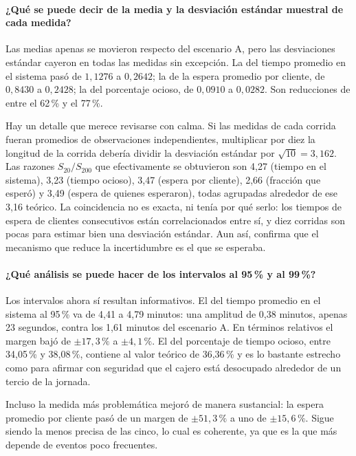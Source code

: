 \documentclass[11pt,letterpaper]{article}
\begin{document}


\paragraph{¿Qué se puede decir de la media y la desviación estándar muestral de cada medida?}

Las medias apenas se movieron respecto del escenario A, pero las desviaciones estándar cayeron en todas las medidas sin excepción. La del tiempo promedio en el sistema pasó de $1{,}1276$ a $0{,}2642$; la de la espera promedio por cliente, de $0{,}8430$ a $0{,}2428$; la del porcentaje ocioso, de $0{,}0910$ a $0{,}0282$. Son reducciones de entre el 62\,\% y el 77\,\%.

Hay un detalle que merece revisarse con calma. Si las medidas de cada corrida fueran promedios de observaciones independientes, multiplicar por diez la longitud de la corrida debería dividir la desviación estándar por $\sqrt{10} = 3{,}162$. Las razones $S_{20}/S_{200}$ que efectivamente se obtuvieron son 4,27 (tiempo en el sistema), 3,23 (tiempo ocioso), 3,47 (espera por cliente), 2,66 (fracción que esperó) y 3,49 (espera de quienes esperaron), todas agrupadas alrededor de ese 3,16 teórico. La coincidencia no es exacta, ni tenía por qué serlo: los tiempos de espera de clientes consecutivos están correlacionados entre sí, y diez corridas son pocas para estimar bien una desviación estándar. Aun así, confirma que el mecanismo que reduce la incertidumbre es el que se esperaba.

\paragraph{¿Qué análisis se puede hacer de los intervalos al 95\,\% y al 99\,\%?}

Los intervalos ahora sí resultan informativos. El del tiempo promedio en el sistema al 95\,\% va de 4,41 a 4,79 minutos: una amplitud de 0,38 minutos, apenas 23 segundos, contra los 1,61 minutos del escenario A. En términos relativos el margen bajó de $\pm 17{,}3\,\%$ a $\pm 4{,}1\,\%$. El del porcentaje de tiempo ocioso, entre 34,05\,\% y 38,08\,\%, contiene al valor teórico de 36,36\,\% y es lo bastante estrecho como para afirmar con seguridad que el cajero está desocupado alrededor de un tercio de la jornada.

Incluso la medida más problemática mejoró de manera sustancial: la espera promedio por cliente pasó de un margen de $\pm 51{,}3\,\%$ a uno de $\pm 15{,}6\,\%$. Sigue siendo la menos precisa de las cinco, lo cual es coherente, ya que es la que más depende de eventos poco frecuentes.
\end{document}
